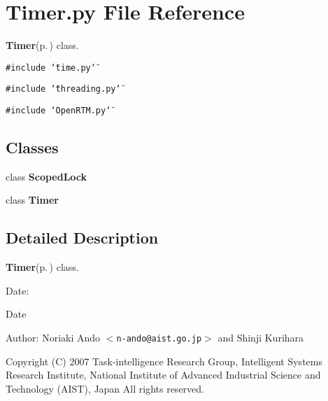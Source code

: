 \section{Timer.py File Reference}
\label{Timer_8py}
{\bf Timer}{\rm (p.\,\pageref{classTimer})} class. 

{\tt \#include \char`\"{}time.py\char`\"{}}\par
{\tt \#include \char`\"{}threading.py\char`\"{}}\par
{\tt \#include \char`\"{}Open\-RTM.py\char`\"{}}\par
\subsection*{Classes}
\begin{CompactItemize}
\item 
class {\bf Scoped\-Lock}
\item 
class {\bf Timer}
\end{CompactItemize}


\subsection{Detailed Description}
{\bf Timer}{\rm (p.\,\pageref{classTimer})} class. 

\begin{Desc}
\item[Date:]\begin{Desc}
\item[Date]\end{Desc}
\end{Desc}
\begin{Desc}
\item[Author:]Noriaki Ando $<${\tt n-ando@aist.go.jp}$>$ and Shinji Kurihara\end{Desc}
Copyright (C) 2007 Task-intelligence Research Group, Intelligent Systems Research Institute, National Institute of Advanced Industrial Science and Technology (AIST), Japan All rights reserved.